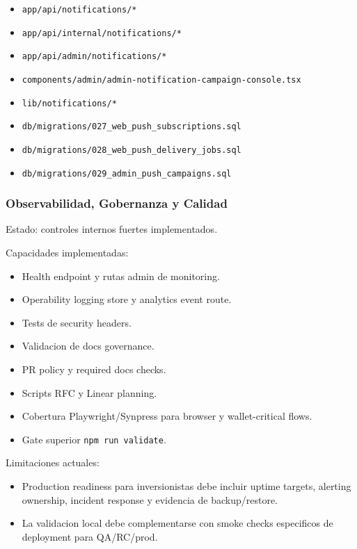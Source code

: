 \documentclass[
  10pt,
  letterpaper,
]{article}
\providecommand{\tightlist}{%
  \setlength{\itemsep}{0pt}\setlength{\parskip}{0pt}}
\let\oldtexttt\texttt
\renewcommand{\texttt}[1]{\oldtexttt{\small #1}}
\begin{document}
\begin{itemize}
\tightlist
\item
  \texttt{app/api/notifications/*}
\item
  \texttt{app/api/internal/notifications/*}
\item
  \texttt{app/api/admin/notifications/*}
\item
  \texttt{components/admin/admin-notification-campaign-console.tsx}
\item
  \texttt{lib/notifications/*}
\item
  \texttt{db/migrations/027\_web\_push\_subscriptions.sql}
\item
  \texttt{db/migrations/028\_web\_push\_delivery\_jobs.sql}
\item
  \texttt{db/migrations/029\_admin\_push\_campaigns.sql}
\end{itemize}

\subsubsection{Observabilidad, Gobernanza y
Calidad}\label{observabilidad-gobernanza-y-calidad}

Estado: controles internos fuertes implementados.

Capacidades implementadas:

\begin{itemize}
\tightlist
\item
  Health endpoint y rutas admin de monitoring.
\item
  Operability logging store y analytics event route.
\item
  Tests de security headers.
\item
  Validacion de docs governance.
\item
  PR policy y required docs checks.
\item
  Scripts RFC y Linear planning.
\item
  Cobertura Playwright/Synpress para browser y wallet-critical flows.
\item
  Gate superior \texttt{npm\ run\ validate}.
\end{itemize}

Limitaciones actuales:

\begin{itemize}
\tightlist
\item
  Production readiness para inversionistas debe incluir uptime targets,
  alerting ownership, incident response y evidencia de backup/restore.
\item
  La validacion local debe complementarse con smoke checks especificos
  de deployment para QA/RC/prod.
\end{itemize}
\end{document}
